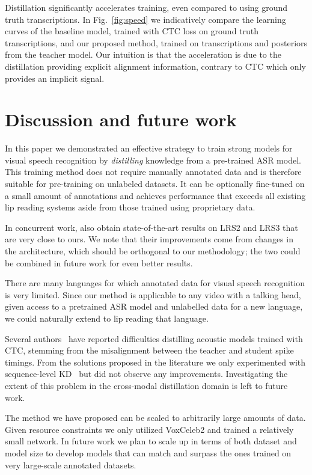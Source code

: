 \documentclass{article}
\def\psec{\vspace{-4pt}}
\begin{document}
Distillation significantly accelerates training, even compared to using ground truth
transcriptions.
In Fig.~\ref{fig:speed} we indicatively compare the learning curves of the baseline model,
trained with CTC loss on ground truth transcriptions, and our proposed method, trained on transcriptions and posteriors from the teacher model.
Our intuition is that the acceleration is due to the distillation providing explicit alignment
information, contrary to CTC which only provides an implicit signal.



\psec
\psec
\psec
\section{Discussion and future work} \psec
\psec
In this paper we demonstrated an effective strategy to train strong models for
visual speech recognition by {\em distilling} knowledge from a pre-trained ASR model. 
This training method does not require manually annotated data
and is therefore suitable for pre-training on unlabeled datasets. 
It can be optionally fine-tuned on a small amount of annotations and achieves
performance that exceeds all existing lip reading systems aside from those trained
using proprietary data.

In concurrent work, \cite{zhang2019spatio} also obtain state-of-the-art results on LRS2 and LRS3 that are very close to ours.
We note that their improvements come from changes in the architecture, which should be orthogonal to our methodology; the two could be combined in future work for even better results.

There are many languages for which annotated data for visual speech recognition is very limited.
Since our method is applicable to any video with a talking head,
given access to a pretrained ASR model and unlabelled data for a new language,
we could naturally extend to lip reading that language.

Several authors~\cite{takashima2019investigation, Kurata2019GuidingCP, ding2019compression, sak2015acoustic} have reported difficulties
distilling acoustic models trained with CTC, stemming from the misalignment between the teacher and student spike timings. 
From the solutions proposed in the literature we only experimented with sequence-level KD~\cite{takashima2019investigation}
but did not observe any improvements.
Investigating the extent of this problem in the cross-modal distillation domain is left to future work.

The method we have proposed can be scaled to arbitrarily large amounts of data.
Given resource constraints we only utilized VoxCeleb2 and trained a relatively small network.
In future work we plan to scale up in terms of both dataset and model size to 
develop models that can match and surpass the ones trained on very large-scale annotated datasets.
\end{document}
